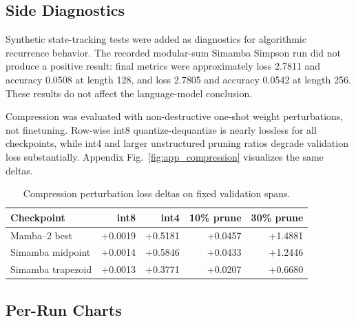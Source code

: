 \documentclass[conference]{IEEEtran}
\newcommand{\modelname}{Simamba\xspace}
\newcommand{\mambatwo}{Mamba--2\xspace}
\begin{document}
\FloatBarrier
\clearpage
\subsection{Side Diagnostics}

Synthetic state-tracking tests were added as diagnostics for algorithmic recurrence behavior. The recorded modular-sum \modelname Simpson run did not produce a positive result: final metrics were approximately loss 2.7811 and accuracy 0.0508 at length 128, and loss 2.7805 and accuracy 0.0542 at length 256. These results do not affect the language-model conclusion.


Compression was evaluated with non-destructive one-shot weight perturbations, not finetuning. Row-wise int8 quantize-dequantize is nearly lossless for all checkpoints, while int4 and larger unstructured pruning ratios degrade validation loss substantially. Appendix Fig.~\ref{fig:app_compression} visualizes the same deltas.


\begin{table}[t]
\caption{Compression perturbation loss deltas on fixed validation spans.}
\label{tab:compression}
\centering
\footnotesize
\begin{tabular}{lrrrr}
\toprule
Checkpoint & int8 & int4 & 10\% prune & 30\% prune\\
\midrule
\mambatwo{} best & +0.0019 & +0.5181 & +0.0457 & +1.4881\\
\modelname{} midpoint & +0.0014 & +0.5846 & +0.0433 & +1.2446\\
\modelname{} trapezoid & +0.0013 & +0.3771 & +0.0207 & +0.6680\\
\bottomrule
\end{tabular}
\end{table}

\FloatBarrier
\subsection{Per-Run Charts}


\end{document}
